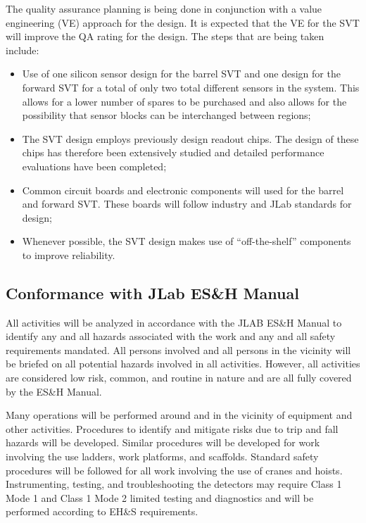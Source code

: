 The quality assurance planning is being done in conjunction with a
value engineering (VE) approach for the design.  It is expected that the
VE for the SVT will improve the QA rating for the design.  The steps that
are being taken include:

\begin{itemize}

\item Use of one silicon sensor design for the barrel SVT and one design for 
the forward SVT for a total of only two total different sensors in the
system.  This allows for a lower number of spares to be purchased and
also allows for the possibility that sensor blocks can be interchanged
between regions;

\item The SVT design employs previously design readout chips.  The design
of these chips has therefore been extensively studied and detailed
performance evaluations have been completed;

\item Common circuit boards and electronic components will used for the
barrel and forward SVT.  These boards will follow industry and JLab
standards for design;

\item Whenever possible, the SVT design makes use of ``off-the-shelf''
components to improve reliability.
\end{itemize}

\subsection{Conformance with JLab ES\&H Manual}
	
All activities will be analyzed in accordance with the JLAB ES\&H Manual 
to identify any and all hazards associated with the work and any and all 
safety requirements mandated.  All persons involved and all persons in the 
vicinity will be briefed on all potential hazards involved in all activities.
However, all activities are considered low risk, common, and routine in 
nature and are all fully covered by the ES\&H Manual.

Many operations will be performed around and in the vicinity of equipment 
and other activities.  Procedures to identify and mitigate risks due to
trip and fall hazards will be developed.  Similar procedures will be
developed for work involving the use ladders, work platforms, and scaffolds. 
Standard safety procedures will be followed for all work involving the use
of cranes and hoists.  Instrumenting, testing, and troubleshooting the 
detectors may require Class 1 Mode 1 and Class 1 Mode 2 limited testing and 
diagnostics and will be performed according to EH\&S requirements.








